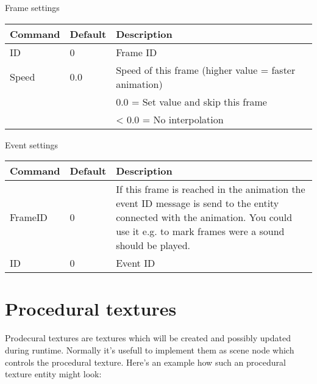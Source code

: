 Frame settings\\

\begin{tabular}{|p{2.5cm}|p{2.5cm}|p{9cm}|}
\hline
\textbf{Command} & \textbf{Default} & \textbf{Description}\\
\hline
ID    & 0   & Frame ID\\
\hline
Speed & 0.0 & Speed of this frame (higher value = faster animation)\\
              &&  0.0 = Set value and skip this frame\\
              && < 0.0 = No interpolation\\
\hline
\end{tabular}


Event settings\\

\begin{tabular}{|p{2.5cm}|p{2.5cm}|p{9cm}|}
\hline
\textbf{Command} & \textbf{Default} & \textbf{Description}\\
\hline
FrameID & 0 &
If this frame is reached in the animation the event ID message is send to the entity connected
with the animation. You could use it e.g. to mark frames were a sound should be played.\\
\hline
ID      & 0 & Event ID\\
\hline
\end{tabular}




\section{Procedural textures}
Prodecural textures are textures which will be created and possibly updated during runtime.
Normally it's usefull to implement them as scene node which controls the procedural texture. Here's
an example how such an procedural texture entity might look:\\

